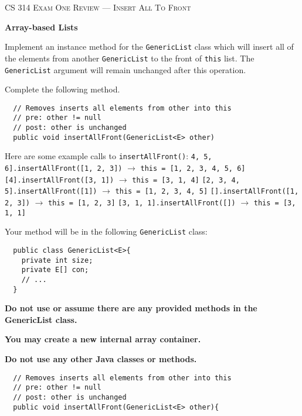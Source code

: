 \documentclass[12pt,letter]{article}
\begin{document}
\noindent\textsc{\large CS 314 Exam One Review --- Insert All To Front}

\vspace{6pt}
\noindent\textbf{Array-based Lists}

\vspace{2pt}
\noindent Implement an instance method for the \texttt{GenericList} class which will 
insert all of the elements from another \texttt{GenericList} to the front of \texttt{this} list.
The \texttt{GenericList} argument will remain unchanged after this operation.

\vspace{4pt}
\noindent Complete the following method.
\begin{verbatim}
  // Removes inserts all elements from other into this
  // pre: other != null
  // post: other is unchanged
  public void insertAllFront(GenericList<E> other)
\end{verbatim}

\vspace{4pt}

\noindent Here are some example calls to \texttt{insertAllFront()}:
\newline
\noindent \texttt{4, 5, 6].insertAllFront([1, 2, 3])} $\rightarrow$ \texttt{this = [1, 2, 3, 4, 5, 6]}
\newline
\noindent \texttt{[4].insertAllFront([3, 1])} $\rightarrow$ \texttt{this = [3, 1, 4]}
\newline
\noindent \texttt{[2, 3, 4, 5].insertAllFront([1])} $\rightarrow$ \texttt{this = [1, 2, 3, 4, 5]}
\newline
\noindent \texttt{[].insertAllFront([1, 2, 3])} $\rightarrow$ \texttt{this = [1, 2, 3]}
\newline
\noindent \texttt{[3, 1, 1].insertAllFront([])} $\rightarrow$ \texttt{this = [3, 1, 1]}
\newline

\noindent Your method will be in the following \texttt{GenericList} class:

\begin{verbatim}
  public class GenericList<E>{
    private int size;
    private E[] con;
    // ...
  }

\end{verbatim}

\noindent \textbf{Do not use or assume there are any provided methods in the GenericList class.}

\noindent \textbf{You may create a new internal array container.}

\noindent \textbf{Do not use any other Java classes or methods.}

\clearpage
\begin{verbatim}
  // Removes inserts all elements from other into this
  // pre: other != null
  // post: other is unchanged
  public void insertAllFront(GenericList<E> other){
\end{verbatim}
\end{document}
